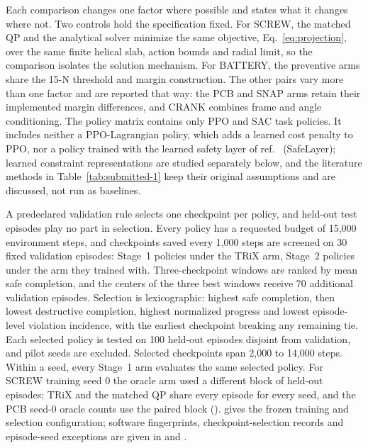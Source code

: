 \documentclass[12pt]{article}
\begin{document}
Each comparison changes one factor where possible and states what it changes
where not. Two controls hold the specification fixed. For SCREW, the matched QP
and the analytical solver minimize the same objective,
Eq.~\eqref{eq:projection}, over the same finite helical slab, action bounds and
radial limit, so the comparison isolates the solution mechanism. For BATTERY, the preventive arms
share the 15-N threshold and margin construction. The other pairs vary more
than one factor and are reported that way: the PCB and SNAP arms retain their
implemented margin differences, and CRANK combines frame and angle
conditioning. The policy matrix contains only PPO and SAC task policies. It
includes neither a PPO-Lagrangian policy, which adds a learned cost penalty to
PPO, nor a policy trained with the learned safety layer of ref.~\cite{ref21}
(SafeLayer); learned constraint representations are studied separately below,
and the literature methods in Table~\ref{tab:submitted-1} keep their original
assumptions and are discussed, not run as baselines.

A predeclared validation rule selects one checkpoint per policy, and held-out
test episodes play no part in selection. Every policy has a requested budget of
15,000 environment steps, and checkpoints saved every 1,000 steps
are screened on 30 fixed validation episodes: Stage~1 policies under the TRiX arm,
Stage~2 policies under the arm they trained with. Three-checkpoint windows are ranked by mean safe
completion, and the centers of the three best windows receive 70 additional
validation episodes. Selection is lexicographic: highest safe completion, then
lowest destructive completion, highest normalized progress and lowest
episode-level violation incidence, with the earliest checkpoint breaking any
remaining tie. Each selected policy is tested on 100 held-out episodes disjoint
from validation, and pilot seeds are excluded. Selected checkpoints span 2,000 to 14,000 steps. Within a seed, every Stage~1 arm evaluates the same selected policy. For
SCREW training seed 0 the oracle arm used a different block of held-out
episodes; TRiX and the matched QP share every episode for every seed, and the
PCB seed-0 oracle counts use the paired block ().
 gives the frozen training and selection configuration;
software fingerprints, checkpoint-selection records and episode-seed
exceptions are given in  and .
\end{document}
